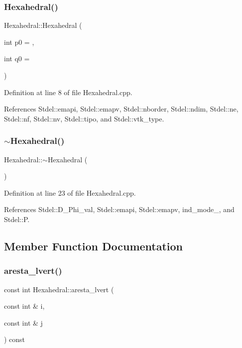 \subsubsection{\texorpdfstring{Hexahedral()}{Hexahedral()}}
{\footnotesize\ttfamily Hexahedral\+::\+Hexahedral (\begin{DoxyParamCaption}\item[{int}]{p0 = {},  }\item[{int}]{q0 = {} }\end{DoxyParamCaption})}



Definition at line 8 of file Hexahedral.\+cpp.



References Stdel\+::emapi, Stdel\+::emapv, Stdel\+::nborder, Stdel\+::ndim, Stdel\+::ne, Stdel\+::nf, Stdel\+::nv, Stdel\+::tipo, and Stdel\+::vtk\+\_\+type.

\mbox{\label{classHexahedral_a5dd55bffa5429ce058c3a4db675a55ac}} 
\subsubsection{\texorpdfstring{$\sim$\+Hexahedral()}{~Hexahedral()}}
{\footnotesize\ttfamily Hexahedral\+::$\sim$\+Hexahedral (\begin{DoxyParamCaption}{ }\end{DoxyParamCaption})}



Definition at line 23 of file Hexahedral.\+cpp.



References Stdel\+::\+D\+\_\+\+Phi\+\_\+val, Stdel\+::emapi, Stdel\+::emapv, ind\+\_\+mode\+\_\+, and Stdel\+::P.



\subsection{Member Function Documentation}
\mbox{\label{classHexahedral_a75bd23113c34de6bef3bcee8957f8f99}} 
\subsubsection{\texorpdfstring{aresta\+\_\+lvert()}{aresta\_lvert()}}
{\footnotesize\ttfamily const int Hexahedral\+::aresta\+\_\+lvert (\begin{DoxyParamCaption}\item[{const int \&}]{i,  }\item[{const int \&}]{j }\end{DoxyParamCaption}) const\hspace{0.3cm}{\ttfamily [virtual]}}



